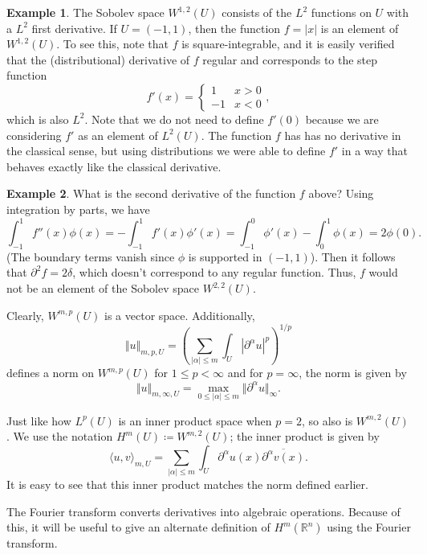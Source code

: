 \documentclass[12pt,letterpaper,reqno]{article}
\theoremstyle{plain}                              %
\theoremstyle{definition}                         %
\newtheorem*{eg}{Example}
\theoremstyle{remark}                             %
\numberwithin{equation}{section}
\newcommand{\R}{\mathbb{R}}                     %
\begin{document}
\begin{eg}
    The Sobolev space $W^{1,2}(U)$ consists of the $L^2$ functions on $U$ with a $L^2$ first derivative. If $U = (-1,1)$, then the function $f=|x|$ is an element of $W^{1,2}(U)$. To see this, note that $f$ is square-integrable, and it is easily verified that the (distributional) derivative of $f$ regular and corresponds to the step function
    \[f'(x) = \begin{cases}
        1 & x>0\\
        -1 & x<0
    \end{cases},\]
    which is also $L^2$. Note that we do not need to define $f'(0)$ because we are considering $f'$ as an element of $L^2(U)$. The function $f$ has has no derivative in the classical sense, but using distributions we were able to define $f'$ in a way that behaves exactly like the classical derivative.
\end{eg}

\begin{eg}
    What is the second derivative of the function $f$ above? Using integration by parts, we have
    \[\int_{-1}^1 f''(x) \phi(x) = - \int_{-1}^1 f'(x)\phi'(x) = \int_{-1}^0 \phi'(x) - \int_{0}^1 \phi(x) = 2\phi(0).\]
    (The boundary terms vanish since $\phi$ is supported in $(-1,1)$). Then it follows that $\partial^2 f=2\delta$, which doesn't correspond to any regular function. Thus, $f$ would not be an element of the Sobolev space $W^{2,2}(U)$.
\end{eg}

Clearly, $W^{m,p}(U)$ is a vector space. Additionally,
\[\Vert u\Vert_{m,p,U} = \left(\sum_{|\alpha|\le m} \int_U|\partial^\alpha u|^p\right)^{1/p}\]
defines a norm on $W^{m,p}(U)$ for $1\le p <\infty$ and for $p=\infty$, the norm is given by
\[\Vert u \Vert_{m,\infty, U} = \max_{0\le |\alpha|\le m}\Vert \partial^\alpha u\Vert_\infty.\]

Just like how $L^p(U)$ is an inner product space when $p=2$, so also is $W^{m,2}(U)$.  We use the notation $H^m(U) \coloneqq W^{m,2}(U)$; the inner product is given by
\[\langle u,v\rangle_{m,U} = \sum_{|\alpha|\le m}\int_U \partial^\alpha u(x) \overline{\partial^\alpha v(x)}.\]
It is easy to see that this inner product matches the norm defined earlier.

The Fourier transform converts derivatives into algebraic operations. Because of this, it will be useful to give an alternate definition of $H^m(\R^n)$ using the Fourier transform.
\end{document}
